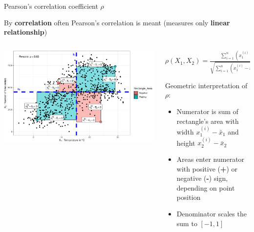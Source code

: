 \documentclass[11pt,compress,t,notes=noshow, aspectratio=169, xcolor=table]{beamer}
\begin{document}
\begin{frame}{Pearson's correlation coefficient $\rho$}

By \textbf{correlation} often Pearson's correlation is meant (measures only \textbf{linear relationship}) %




\begin{columns}[c, totalwidth=\textwidth]
\begin{column}{0.5\linewidth}
\includegraphics[width = \textwidth]{figure/pearson_cor}
\end{column}
\begin{column}{0.5\linewidth}

\centerline{$\rho(X_1, X_2) = \tfrac{\sum_{i=1}^{n}{(x_1^{(i)}-\bar{x}_1) \cdot (x_2^{(i)}-\bar{x}_2)}}{\sqrt{\sum_{i=1}^{n}{(x_1^{(i)}-\bar{x}_1)^2 \sum_{i=1}^{n}{(x_2^{(i)}-\bar{x}_2)^2 }}}} \in [-1, 1]$}

\medskip

Geometric interpretation of $\rho$:
\begin{itemize}
    \item Numerator is sum of rectangle's area with width $x_1^{(i)}-\bar{x}_1$ and height $x_2^{(i)}-\bar{x}_2$
    \item Areas enter numerator with positive (\textbf{+}) or negative (\textbf{-}) sign, depending on point position
    \item Denominator scales the sum to $ [-1, 1]$
\end{itemize}
\end{column}
\end{columns}


\end{frame}
\end{document}
